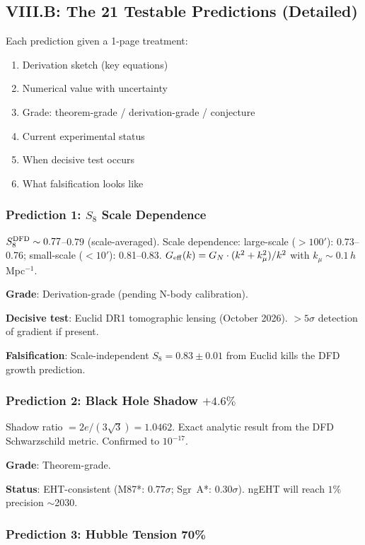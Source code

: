\documentclass[11pt,a4paper]{article}
\begin{document}
\subsection{VIII.B: The 21 Testable Predictions (Detailed)}

Each prediction given a 1-page treatment:
\begin{enumerate}
\item Derivation sketch (key equations)
\item Numerical value with uncertainty
\item Grade: theorem-grade / derivation-grade / conjecture
\item Current experimental status
\item When decisive test occurs
\item What falsification looks like
\end{enumerate}

\subsubsection{Prediction 1: $S_8$ Scale Dependence}

$S_8^{\rm DFD} \sim 0.77$--$0.79$ (scale-averaged). Scale dependence: large-scale ($> 100'$): 0.73--0.76; small-scale ($< 10'$): 0.81--0.83. $G_{\rm eff}(k) = G_N \cdot (k^2 + k_\mu^2)/k^2$ with $k_\mu \sim 0.1\,h\,$Mpc$^{-1}$.

\textbf{Grade}: Derivation-grade (pending N-body calibration).

\textbf{Decisive test}: Euclid DR1 tomographic lensing (October 2026). $> 5\sigma$ detection of gradient if present.

\textbf{Falsification}: Scale-independent $S_8 = 0.83 \pm 0.01$ from Euclid kills the DFD growth prediction.

\subsubsection{Prediction 2: Black Hole Shadow $+4.6\%$}

Shadow ratio $= 2e/(3\sqrt{3}) = 1.0462$. Exact analytic result from the DFD Schwarzschild metric. Confirmed to $10^{-17}$.

\textbf{Grade}: Theorem-grade.

\textbf{Status}: EHT-consistent (M87*: $0.77\sigma$; Sgr~A*: $0.30\sigma$). ngEHT will reach $1\%$ precision $\sim$2030.

\subsubsection{Prediction 3: Hubble Tension 70\%}
\end{document}
